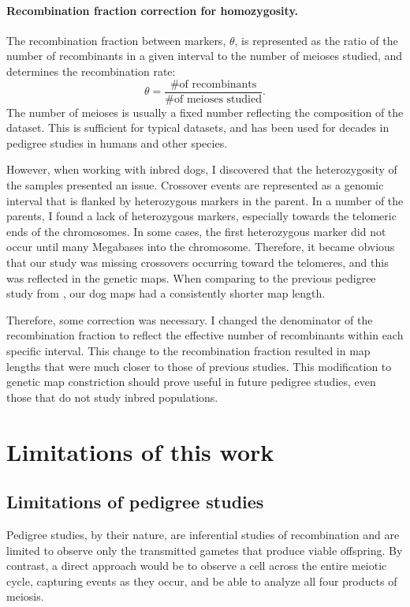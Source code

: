 \paragraph{Recombination fraction correction for homozygosity.}
The recombination fraction between markers, $\theta$, is represented as the ratio of the number of recombinants in a given interval to the number of meioses studied, and determines the recombination rate:
\begin{equation*}
    \theta = \frac{ \text{\# of recombinants} } { \text{\# of meioses studied} } .
\end{equation*}
The number of meioses is usually a fixed number reflecting the composition of the dataset.
This is sufficient for typical datasets, and has been used for decades in pedigree studies in humans and other species.

However, when working with inbred dogs, I discovered that the heterozygosity of the samples presented an issue.
Crossover events are represented as a genomic interval that is flanked by heterozygous markers in the parent.
In a number of the parents, I found a lack of heterozygous markers, especially towards the telomeric ends of the chromosomes.
In some cases, the first heterozygous marker did not occur until many Megabases into the chromosome.
Therefore, it became obvious that our study was missing crossovers occurring toward the telomeres, and this was reflected in the genetic maps.
When comparing to the previous pedigree study from \citet{Wong2010}, our dog maps had a consistently shorter map length.

Therefore, some correction was necessary.
I changed the denominator of the recombination fraction to reflect the effective number of recombinants within each specific interval.
This change to the recombination fraction resulted in map lengths that were much closer to those of previous studies.
This modification to genetic map constriction should prove useful in future pedigree studies, even those that do not study inbred populations.


\section{Limitations of this work}

\subsection{Limitations of pedigree studies}
Pedigree studies, by their nature, are inferential studies of recombination and are limited to observe only the transmitted gametes that produce viable offspring.
By contrast, a direct approach would be to observe a cell across the entire meiotic cycle, capturing events as they occur, and be able to analyze all four products of meiosis.


